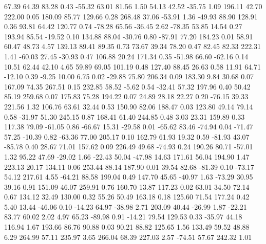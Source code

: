    67.39   64.39   83.28    0.43
  -55.32   63.01   81.56    1.50
   54.13   42.52  -35.75    1.09
  196.11   42.70  222.00    0.05
  180.09   85.77  129.66    0.28
  268.48   37.06  -53.91    1.36
  -49.93   88.90  128.91    0.36
   93.81   64.42  120.77    0.74
  -78.28   65.56  -36.45    2.62
  -78.35   53.85   14.54    0.27
  193.94   85.54  -19.52    0.10
  134.88   88.04  -30.76    0.80
  -87.91   77.20  184.23    0.01
   58.91   60.47   48.73    4.57
  139.13   89.41   89.35    0.73
   73.67   39.34   78.20    0.47
   82.45   82.33  222.31    1.41
  -60.03   27.45  -30.93    0.47
  106.88   20.24  171.34    0.35
  -51.98   66.60  -62.16    0.14
   10.51   62.44   42.10    4.65
   59.89   69.05  101.19    0.48
  127.40   88.45   26.63    0.58
   11.91   64.71  -12.10    0.39
   -9.25   10.00    6.75    0.02
  -29.88   75.80  206.34    0.09
  183.30    9.84   30.68    0.07
  167.09   74.35  267.51    0.15
  232.85   58.52   -5.62    0.54
  -32.41   57.32  197.96    0.40
   50.42   85.19  259.68    0.07
  175.83   75.28  194.22    0.07
   24.89   28.18   22.27    0.20
  -76.15   39.33  221.56    1.32
  106.76   63.61   32.44    0.53
  150.90   82.06  188.47    0.03
  123.80   49.14   79.14    0.58
  -31.97   51.30  245.15    0.87
  168.41   61.40  244.85    0.48
    3.03   23.31  159.89    0.33
  117.38   79.09  -61.05    0.86
  -66.67   15.31  -29.58    0.01
  -65.62   83.46  -74.94    0.04
  -71.47   57.25  -10.39    0.82
  -63.36   77.00  205.17    0.10
  162.79   61.93   19.32    0.59
  -81.93   43.07  -85.78    0.40
   28.67   71.01  157.62    0.09
  226.49   49.68  -74.93    0.24
  190.26   80.71  -57.01    1.32
   95.22   47.69  -29.02    1.66
  -22.43   50.04  -47.98   14.63
  171.61   56.04  194.90    1.47
  223.13   20.17  134.11    0.06
  253.44   88.14  187.90    0.01
   39.54   82.68  -81.39    0.10
  -73.17   54.12  217.61    4.55
  -64.21   88.58  199.04    0.49
  147.70   45.65  -40.97    1.63
  -73.29   30.95   39.16    0.91
  151.09   46.07  259.91    0.76
  160.70   13.87  117.23    0.02
   63.01   34.50   72.14    0.67
  134.12   32.49  130.00    0.32
   55.26   50.49  163.18    0.18
  125.60   71.54  177.24    0.42
    5.40   13.44  -46.06    0.10
  -14.23   64.97  -38.98    2.71
  203.09   40.44  -26.99    1.87
  -22.21   83.77   60.02    2.02
    4.97   65.23  -89.98    0.91
  -14.21   79.54  129.53    0.33
  -35.97   44.18  116.94    1.67
  193.66   86.76   90.88    0.03
   90.21   88.82  125.65    1.56
  133.49   59.52   48.88    6.29
  264.99   57.11  235.97    3.65
  266.04   68.39  227.03    2.57
  -74.51   57.67  242.32    1.01
